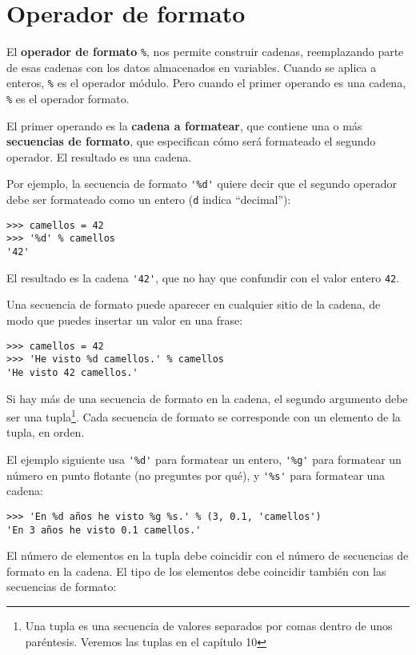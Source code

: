 \section{Operador de formato}


El {\bf operador de formato} {\tt \%},
nos permite construir cadenas, reemplazando parte de esas cadenas
con los datos almacenados en variables.
Cuando se aplica a enteros, {\tt \%} es el operador módulo. Pero
cuando el primer operando es una cadena, {\tt \%} es el operador formato.


El primer operando es la {\bf cadena a formatear}, que contiene
una o más {\bf secuencias de formato}, que especifican cómo
será formateado el segundo operador. El resultado es una cadena.


Por ejemplo, la secuencia de formato \verb"'%d'" quiere decir
que el segundo operador debe ser formateado como un
entero ({\tt d} indica ``decimal''):

\beforeverb
\begin{verbatim}
>>> camellos = 42
>>> '%d' % camellos
'42'
\end{verbatim}
\afterverb
%
El resultado es la cadena \verb"'42'", que no hay que confundir
con el valor entero {\tt 42}.

Una secuencia de formato puede aparecer en cualquier sitio de la cadena,
de modo que puedes insertar un valor en una frase:

\beforeverb
\begin{verbatim}
>>> camellos = 42
>>> 'He visto %d camellos.' % camellos
'He visto 42 camellos.'
\end{verbatim}
\afterverb
%
Si hay más de una secuencia de formato en la cadena,
el segundo argumento debe ser una tupla\footnote{Una tupla es una
secuencia de valores separados por comas dentro de unos paréntesis.
Veremos las tuplas en el capítulo 10}. Cada secuencia de formato se
corresponde con un elemento de la tupla, en orden.

El ejemplo siguiente usa \verb"'%d'" para formatear un entero,
\verb"'%g'" para formatear
un número en punto flotante (no preguntes por qué), y \verb"'%s'" para
formatear una cadena:

\beforeverb
\begin{verbatim}
>>> 'En %d años he visto %g %s.' % (3, 0.1, 'camellos')
'En 3 años he visto 0.1 camellos.'
\end{verbatim}
\afterverb
%
El número de elementos en la tupla debe coincidir con el número
de secuencias de formato en la cadena. El tipo de los
elementos debe coincidir también con las secuencias de formato:

